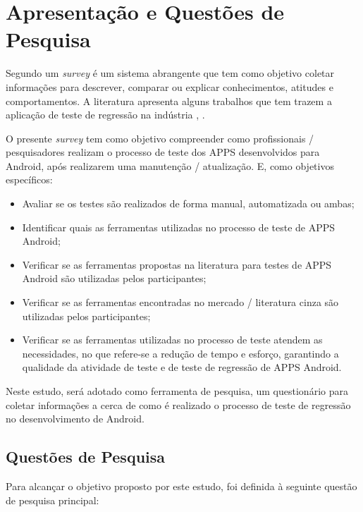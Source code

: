 \acresetall 

\section{Apresentação e Questões de Pesquisa}

Segundo \cite{PSK2001} um \textit{survey} é um sistema abrangente que tem como objetivo coletar informações para descrever, comparar ou explicar conhecimentos, atitudes e comportamentos. A literatura apresenta alguns trabalhos que tem trazem a aplicação de teste de regressão na indústria \cite{Ali2019}, \cite{630875}.


O presente \textit{survey} tem como objetivo compreender como profissionais / pesquisadores realizam o processo de teste dos \ac{APPS} desenvolvidos para Android, após realizarem uma manutenção / atualização. E, como objetivos específicos:

\begin{itemize}
    \item Avaliar se os testes são realizados de forma manual, automatizada ou ambas;
    \item Identificar quais as ferramentas utilizadas no processo de teste de \ac{APPS} Android;
    \item Verificar se as ferramentas propostas na literatura para testes de \ac{APPS} Android são utilizadas pelos participantes;
    \item Verificar se as ferramentas encontradas no mercado / literatura cinza são utilizadas pelos participantes;
    \item Verificar se as ferramentas utilizadas no processo de teste atendem as necessidades, no que refere-se a redução de tempo e esforço, garantindo a qualidade da atividade de teste e de teste de regressão de \ac{APPS} Android.
\end{itemize}

Neste estudo, será adotado como ferramenta de pesquisa, um questionário para coletar informações a cerca de como é realizado o processo de teste de regressão no desenvolvimento de  Android.

\subsection{Questões de Pesquisa}
Para alcançar o objetivo proposto por este estudo, foi definida à seguinte questão de pesquisa principal:
\leavevspace 

\begin{center}
    \noindent{}
\end{center}

